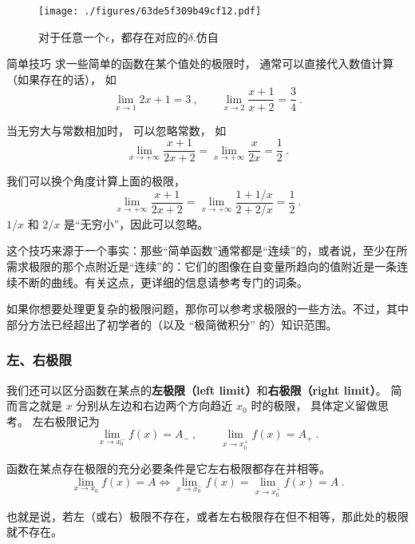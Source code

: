 \begin{figure}[ht]
\centering
\texttt{[image: ./figures/63de5f309b49cf12.pdf]}
\caption{对于任意一个$\epsilon$，都存在对应的$\delta$.仿自\cite{Thomas}} \label{fig_FunLim_8}
\end{figure}

\begin{example}{简单技巧}
求一些简单的函数在某个值处的极限时， 通常可以直接代入数值计算（如果存在的话）， 如
\begin{equation}
\lim_{x\to 1} 2x + 1 = 3 ~,\qquad \lim_{x\to 2}\frac{x + 1}{x + 2} = \frac34~.
\end{equation}

当无穷大与常数相加时， 可以忽略常数， 如
\begin{equation}
\lim_{x\to +\infty} \frac{x + 1}{2x + 2} = \lim_{x\to +\infty} \frac{x}{2x} = \frac12~.
\end{equation}

我们可以换个角度计算上面的极限，
\begin{equation}
\lim_{x\to +\infty} \frac{x + 1}{2x + 2} = \lim_{x\to +\infty} \frac{1 + 1/x}{2 + 2/x} = \frac12~.
\end{equation}
$1/x$ 和 $2/x$ 是“无穷小”，因此可以忽略。

这个技巧来源于一个事实：那些“简单函数”通常都是“连续”的，或者说，至少在所需求极限的那个点附近是“连续”的：它们的图像在自变量所趋向的值附近是一条连续不断的曲线。有关这点，更详细的信息请参考专门的词条。

如果你想要处理更复杂的极限问题，那你可以参考求极限的一些方法。不过，其中部分方法已经超出了初学者的（以及 “极简微积分” 的）知识范围。
\end{example}

\subsubsection{左、右极限}
我们还可以区分函数在某点的\textbf{左极限（left limit）}和\textbf{右极限（right limit）}。 简而言之就是 $x$ 分别从左边和右边两个方向趋近 $x_0$ 时的极限， 具体定义留做思考。 左右极限记为
\begin{equation}
\lim_{x\to x_0^-} f(x) = A_- ~,\qquad \lim_{x\to x_0^+} f(x) = A_+~.
\end{equation}

\begin{theorem}{}
函数在某点存在极限的充分必要条件是它左右极限都存在并相等。
$$\lim_{x\to x_0} f(x) = A \Leftrightarrow \lim_{x\to x_0^-} f(x) = \lim_{x\to x_0^+} f(x) = A ~.$$

也就是说，若左（或右）极限不存在，或者左右极限存在但不相等，那此处的极限就不存在。
\end{theorem}

